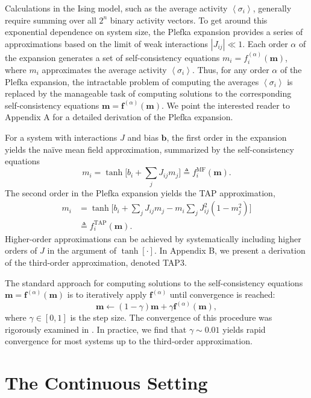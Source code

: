 \documentclass[letterpaper]{article} %
\begin{document}
Calculations in the Ising model, such as the average activity $\left<\sigma_i\right>$, generally require summing over all $2^n$ binary activity vectors. To get around this exponential dependence on system size, the Plefka expansion provides a series of approximations based on the limit of weak interactions $|J_{ij}|\ll 1$. Each order $\alpha$ of the expansion generates a set of self-consistency equations $m_i = f_i^{(\alpha)}(\bm{m})$, where $m_i$ approximates the average activity $\left<\sigma_i\right>$. Thus, for any order $\alpha$ of the Plefka expansion, the intractable problem of computing the averages $\left<\sigma_i\right>$ is replaced by the manageable task of computing solutions to the corresponding self-consistency equations $\bm{m} = \bm{f}^{(\alpha)}(\bm{m})$. We point the interested reader to Appendix A for a detailed derivation of the Plefka expansion.

For a system with interactions $J$ and bias $\bm{b}$, the first order in the expansion yields the na\"{i}ve mean field approximation, summarized by the self-consistency equations
\begin{equation}
m_i = \tanh\Big[b_i + \sum_j J_{ij}m_j \Big] \triangleq f^{\text{MF}}_i(\bm{m}).
\end{equation}
The second order in the Plefka expansion yields the TAP approximation,
\begin{align}
m_i &= \tanh\Big[b_i + \sum_j J_{ij}m_j - m_i\sum_j J_{ij}^2(1-m_j^2) \Big] \nonumber \\
&\triangleq f^{\text{TAP}}_i(\bm{m}).
\end{align}
Higher-order approximations can be achieved by systematically including higher orders of $J$ in the argument of $\tanh[\cdot]$. In Appendix B, we present a derivation of the third-order approximation, denoted TAP3.

The standard approach for computing solutions to the self-consistency equations $\bm{m} = \bm{f}^{(\alpha)}(\bm{m})$ is to iteratively apply $\bm{f}^{(\alpha)}$ until convergence is reached:
\begin{equation}
\bm{m} \leftarrow (1-\gamma)\bm{m} + \gamma\bm{f}^{(\alpha)}(\bm{m}),
\end{equation}
where $\gamma\in [0,1]$ is the step size. The convergence of this procedure was rigorously examined in \cite{Bolthausen-01}. In practice, we find that $\gamma\sim 0.01$ yields rapid convergence for most systems up to the third-order approximation.

\section{The Continuous Setting}
\end{document}
